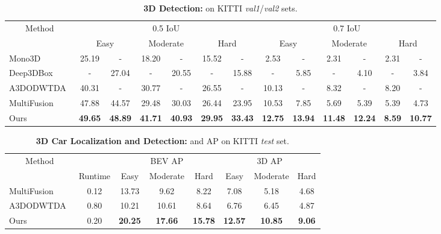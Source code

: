 \documentclass[10pt,twocolumn,letterpaper]{article}
\begin{document}
	\begin{table*}[t!]
		\small
		\centering
		\begin{tabular}{|l||c@{~/~}cc@{~/~}cc@{~/~}c||c@{~/~}cc@{~/~}cc@{~/~}c|}
			\hline
			\multicolumn{1}{|c||}{Method} & \multicolumn{6}{c||}{0.5 IoU} & \multicolumn{6}{c|}{0.7 IoU} \\
			\cline{2-13} &
			\multicolumn{2}{c}{Easy} & \multicolumn{2}{c}{Moderate} & \multicolumn{2}{c||}{Hard} &
			\multicolumn{2}{c}{Easy} & \multicolumn{2}{c}{Moderate} & \multicolumn{2}{c|}{Hard} \\ \hline
			Mono3D~\cite{chen_mono3d}   & 25.19 &   -   & 18.20 &   -   & 15.52 &   -   &  2.53 &   -   &  2.31 &   -   &  2.31 &   -   \\
			Deep3DBox~\cite{mousavian_deep3dbox} &   -   & 27.04 &   -   & 20.55 &   -   & 15.88 &    -  &  5.85 &   -   &  4.10 &   -   &  3.84 \\ 
			A3DODWTDA~\cite{lindernoren}        & 40.31 &   -   & 30.77 &   -   & 26.55 &   -   & 10.13 &   -   &  8.32 &   -   &  8.20 &   -   \\
			MultiFusion~\cite{xu_multifusion}  & 47.88 & 44.57 & 29.48 & 30.03 & 26.44 & 23.95 & 10.53 &  7.85 &  5.69 &  5.39 &  5.39 &  4.73 \\ \hline
			Ours      & \textbf{49.65} &   \textbf{48.89}   & \textbf{41.71} &   \textbf{40.93}   & \textbf{29.95} & \textbf{33.43}   &  
			\textbf{12.75} &   \textbf{13.94}   & \textbf{11.48} &   \textbf{12.24}   & \textbf{8.59} &   \textbf{10.77} \\
			\hline
		\end{tabular}
		\caption{\textbf{3D Detection:} \emph{} on KITTI \emph{val1}/\emph{val2} sets.}
		\label{tab:kitti_val_3d}
	\end{table*}
	
	\begin{table*}[t!]
		\small
		\centering
		\begin{tabular}{|l||c|ccc||ccc|}
			\hline
			\multicolumn{1}{|c||}{Method} & & \multicolumn{3}{c||}{BEV AP} & \multicolumn{3}{c|}{3D AP} \\
			\cline{3-8}               & Runtime &  Easy & Moderate &  Hard &  Easy & Moderate &  Hard \\ \hline
			MultiFusion~\cite{xu_multifusion} & 0.12 & 13.73 &     9.62 &  8.22 &  7.08 &     5.18 &  4.68 \\
			A3DODWTDA~\cite{lindernoren} & 0.80 & 10.21 &    10.61 &  8.64 &  6.76 &     6.45 &  4.87 \\ \hline
			Ours                         & 0.20 & \textbf{20.25} & \textbf{17.66} & \textbf{15.78} &
			\textbf{12.57} & \textbf{10.85} & \textbf{ 9.06} \\ \hline
		\end{tabular}
		\caption{\textbf{3D Car Localization and Detection:} \emph{} and \emph{} AP on KITTI \emph{test} set.}
		\label{tab:kitti_test}
	\end{table*}
	
\end{document}
